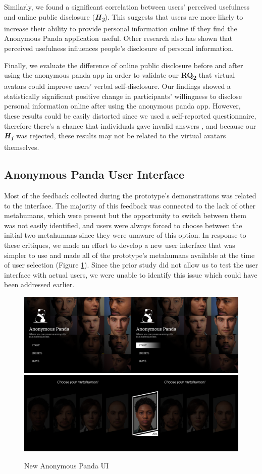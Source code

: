 Similarly, we found a significant correlation between users' perceived usefulness and online public disclosure (\textbf{\textit{H\textsubscript{3}}}). This suggests that users are more likely to increase their ability to provide personal information online if they find the Anonymous Panda application useful. Other research \cite{ZHO18, SHA21} also has shown that perceived usefulness influences people's disclosure of personal information.

Finally, we evaluate the difference of online public disclosure before and after using the anonymous panda app in order to validate our \textbf{RQ\textsubscript{2}} that virtual avatars could improve users' verbal self-disclosure. Our findings showed a statistically significant positive change in participants' willingness to disclose personal information online after using the anonymous panda app. However, these results could be easily distorted since we used a self-reported questionnaire, therefore there's a chance that individuals gave invalid answers \cite{DEM15}, and because our \textbf{\textit{H\textsubscript{1}}} was rejected, these results may not be related to the virtual avatars themselves.

\subsection{Anonymous Panda User Interface}
Most of the feedback collected during the prototype's demonstrations was related to the interface. The majority of this feedback was connected to the lack of other metahumans, which were present but the opportunity to switch between them was not easily identified, and users were always forced to choose between the initial two metahumans since they were unaware of this option. In response to these critiques, we made an effort to develop a new user interface that was simpler to use and made all of the prototype's metahumans available at the time of user selection (Figure \ref{fig:newUI}). Since the prior study did not allow us to test the user interface with actual users, we were unable to identify this issue which could have been addressed earlier.

\begin{figure}[!htb]
\includegraphics[width=\textwidth]{figures/startMenu.png}
\includegraphics[width=\textwidth]{figures/metahumanMenu.png}
\centering
\caption{New Anonymous Panda UI}
\label{fig:newUI}
\end{figure}
